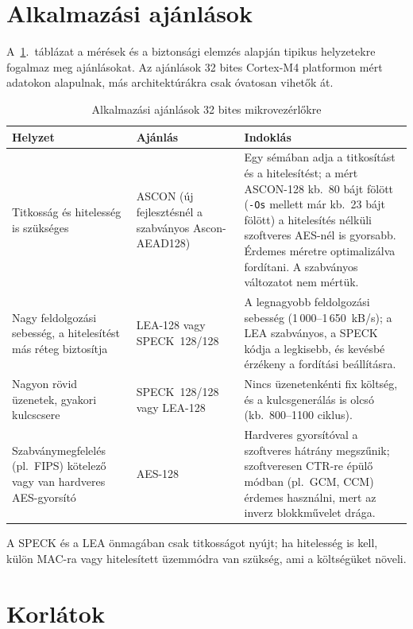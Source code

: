 \documentclass[a4paper,12pt]{report}
\theoremstyle{definition}
\theoremstyle{remark}
\begin{document}
\section{Alkalmazási ajánlások}

A~\ref{tab:ajanlasok}.~táblázat a mérések és a biztonsági elemzés alapján tipikus helyzetekre fogalmaz meg ajánlásokat. Az ajánlások 32 bites Cortex-M4 platformon mért adatokon alapulnak, más architektúrákra csak óvatosan vihetők át.

\begin{table}[htbp]
    \centering
    \small
    \caption{Alkalmazási ajánlások 32 bites mikrovezérlőkre}
    \label{tab:ajanlasok}
    \begin{tabularx}{\textwidth}{|p{4.2cm}|p{3.0cm}|X|}
        \hline
        \textbf{Helyzet} & \textbf{Ajánlás} & \textbf{Indoklás} \\ \hline
        Titkosság és hitelesség is szükséges & ASCON (új fejlesztésnél a szabványos Ascon-AEAD128) & Egy sémában adja a titkosítást és a hitelesítést; a mért ASCON-128 kb.\ 80 bájt fölött (\texttt{-Os} mellett már kb.\ 23 bájt fölött) a hitelesítés nélküli szoftveres AES-nél is gyorsabb. Érdemes méretre optimalizálva fordítani. A szabványos változatot nem mértük. \\ \hline
        Nagy feldolgozási sebesség, a hitelesítést más réteg biztosítja & LEA-128 vagy SPECK~128/128 & A legnagyobb feldolgozási sebesség (1\,000--1\,650~kB/s); a LEA szabványos, a SPECK kódja a legkisebb, és kevésbé érzékeny a fordítási beállításra. \\ \hline
        Nagyon rövid üzenetek, gyakori kulcscsere & SPECK~128/128 vagy LEA-128 & Nincs üzenetenkénti fix költség, és a kulcsgenerálás is olcsó (kb.\ 800--1100 ciklus). \\ \hline
        Szabványmegfelelés (pl.\ FIPS) kötelező vagy van hardveres AES-gyorsító & AES-128 & Hardveres gyorsítóval a szoftveres hátrány megszűnik; szoftveresen CTR-re épülő módban (pl.\ GCM, CCM) érdemes használni, mert az inverz blokkművelet drága. \\ \hline
    \end{tabularx}
\end{table}

A SPECK és a LEA önmagában csak titkosságot nyújt; ha hitelesség is kell, külön MAC-ra vagy hitelesített üzemmódra van szükség, ami a költségüket növeli.

\section{Korlátok}
\end{document}
